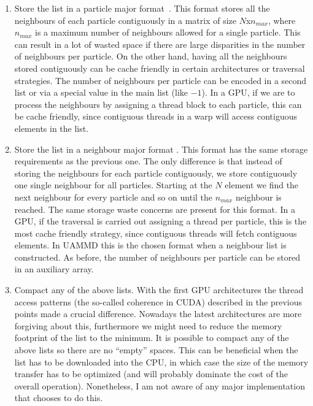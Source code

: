 \documentclass[ twoside,openright,titlepage,numbers=noenddot,%
headinclude,footinclude,cleardoublepage=empty,abstract=on,
BCOR=5mm,paper=b5,fontsize=11pt, dvipsnames
]{scrreprt}
\newcommand{\uammd}{\gls{UAMMD}\xspace}
\newcommand{\gpu}{\gls{GPU}\xspace}
\begin{document}
\begin{enumerate}
\item Store the list in a particle major format~\cite{Anderson2008}\cite{Plimpton1995}.
  This format stores all the neighbours of each particle contiguously in a matrix of size $N$x$n_{max}$, where $n_{max}$ is a maximum number of neighbours allowed for a single particle. This can result in a lot of wasted space if there are large disparities in the number of neighbours per particle. On the other hand, having all the neighbours stored contiguously can be cache friendly in certain architectures or traversal strategies. The number of neighbours per particle can be encoded in a second list or via a special value in the main list (like $-1$). In a \gpu, if we are to process the neighbours by assigning a thread block to each particle, this can be cache friendly, since contiguous threads in a warp will access contiguous elements in the list.
\item Store the list in a neighbour major format \cite{Berendsen1995}.
  This format has the same storage requirements as the previous one. The only difference is that instead of storing the neighbours for each particle contiguously, we store contiguously one single neighbour for all particles. Starting at the $N$ element we find the next neighbour for every particle and so on until the $n_{max}$ neighbour is reached. The same storage waste concerns are present for this format. In a \gpu, if the traversal is carried out assigning a thread per particle, this is the most cache friendly strategy, since contiguous threads will fetch contiguous elements. In \uammd this is the chosen format when a neighbour list is constructed. 
  As before, the number of neighbours per particle can be stored in an auxiliary array.
\item Compact any of the above lists.%
  With the first \gpu architectures the thread access patterns (the so-called coherence in CUDA) described in the previous points made a crucial difference. Nowadays the latest architectures are more forgiving about this, furthermore we might need to reduce the memory footprint of the list to the minimum. It is possible to compact any of the above lists so there are no ``empty'' spaces. This can be beneficial when the list has to be downloaded into the CPU, in which case the size of the memory transfer has to be optimized (and will probably dominate the cost of the overall operation). Nonetheless, I am not aware of any major implementation that chooses to do this.
\end{enumerate}
\end{document}
